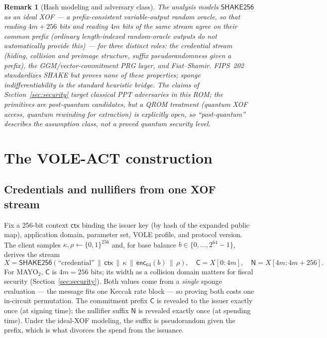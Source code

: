 \documentclass[11pt]{article}
\newtheorem{remark}{Remark}
\newcommand{\shake}{\mathsf{SHAKE256}}
\newcommand{\ctx}{\mathsf{ctx}}
\newcommand{\enc}{\mathsf{enc}_{64}}
\newcommand{\Cred}{\mathsf{C}}
\newcommand{\Null}{\mathsf{N}}
\begin{document}
\begin{remark}[Hash modeling and adversary class]
\label{rem:xof}
The analysis models $\shake$ as an ideal XOF --- a \emph{prefix-consistent}
variable-output random oracle, so that reading $4m{+}256$ bits and reading
$4m$ bits of the same stream agree on their common prefix (ordinary
length-indexed random-oracle outputs do not automatically provide this) ---
for three distinct roles: the credential stream (hiding, collision and
preimage structure, suffix pseudorandomness given a prefix), the
GGM/vector-commitment PRG layer, and Fiat--Shamir. FIPS~202 standardizes
SHAKE but proves none of these properties; sponge indifferentiability is
the standard heuristic bridge. The claims of
Section~\ref{sec:security} target \emph{classical} PPT adversaries in this
ROM; the primitives are post-quantum candidates, but a QROM treatment
(quantum XOF access, quantum rewinding for extraction) is explicitly open,
so ``post-quantum'' describes the assumption class, not a proved quantum
security level.
\end{remark}

\FloatBarrier

\section{The VOLE-ACT construction}
\label{sec:scheme}

\subsection{Credentials and nullifiers from one XOF stream}

Fix a 256-bit context $\ctx$ binding the issuer key (by hash of the expanded
public map), application domain, parameter set, VOLE profile, and protocol
version. The client samples $\kappa, \rho \gets \{0,1\}^{256}$ and, for base
balance $b \in \{0,\dots,2^{64}{-}1\}$, derives the stream
\[
X = \shake(\text{``credential''} \,\|\, \ctx \,\|\, \kappa \,\|\, \enc(b) \,\|\, \rho),
\quad
\Cred = X[0 : 4m], \quad \Null = X[4m : 4m{+}256].
\]
For MAYO$_2$, $\Cred$ is $4m = 256$ bits; its width as a collision domain
matters for fiscal security (Section~\ref{sec:security}).
Both values come from a \emph{single} sponge evaluation --- the message fits
one Keccak rate block --- so proving both costs one in-circuit permutation.
The commitment prefix $\Cred$ is revealed to the issuer exactly once (at
signing time); the nullifier suffix $\Null$ is revealed exactly once (at
spending time). Under the ideal-XOF modeling, the suffix is pseudorandom
given the prefix, which is what divorces the spend from the issuance.
\end{document}
